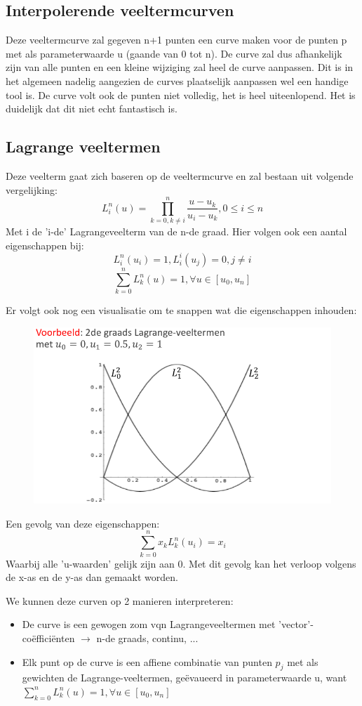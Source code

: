 \documentclass[12pt,a4paper]{article}
\begin{document}
	
	\subsection{Interpolerende veeltermcurven}
	Deze veeltermcurve zal gegeven n+1 punten een curve maken voor de punten p met als parameterwaarde u (gaande van 0 tot n). De curve zal dus afhankelijk zijn van alle punten en een kleine wijziging zal heel de curve aanpassen. Dit is in het algemeen nadelig aangezien de curves plaatselijk aanpassen wel een handige tool is. De curve volt ook de punten niet volledig, het is heel uiteenlopend. Het is duidelijk dat dit niet echt fantastisch is. 
	
	
	\subsection{Lagrange veeltermen}
	Deze veelterm gaat zich baseren op de veeltermcurve en zal bestaan uit volgende vergelijking: 
	\[L_i^n(u) = \prod_{k = 0, k \neq i}^{n} \frac{u - u_k}{u_i - u_k}, 0 \leq i \leq n\]
	Met i de 'i-de' Lagrangeveelterm van de n-de graad. Hier volgen ook een aantal eigenschappen bij: 
	\[L_i^n(u_i) = 1, L_i^i(u_j) = 0, j \neq i\]
	\[\sum_{k = 0}^{n} L_k^n(u) = 1, \forall u \in [u_0, u_n]\]
	
	Er volgt ook nog een visualisatie om te snappen wat die eigenschappen inhouden: 
	\begin{figure}[H]
		\centering
		\includegraphics[width=0.8\linewidth]{afbeeldingen/Beziercurven/Lagrange-veelterm-voorbeeld}
		\label{fig:lagrange-veelterm-voorbeeld}
	\end{figure}

	Een gevolg van deze eigenschappen: 
	\[\sum_{k = 0}^{n} x_k L_k^n(u_i) = x_i\]
	Waarbij alle 'u-waarden' gelijk zijn aan 0. Met dit gevolg kan het verloop volgens de x-as en de y-as dan gemaakt worden. 
	
	We kunnen deze curven op 2 manieren interpreteren: 
	\begin{itemize}
		\item De curve is een gewogen zom vqn Lagrangeveeltermen met 'vector'-coëfficiënten $\rightarrow$ n-de graads, continu, ...
		\item Elk punt op de curve is een affiene combinatie van punten $p_j$ met als gewichten de Lagrange-veeltermen, geëvaueerd in parameterwaarde u, want \(\sum_{k=0}^{n} L_k^n(u) = 1, \forall u \in [u_0, u_n] \)
	\end{itemize}
\end{document}
